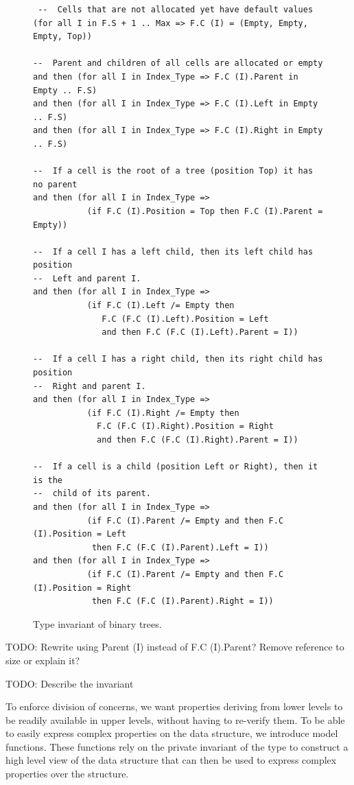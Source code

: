 \documentclass[11pt,a4paper]{article}
\begin{document}
\begin{figure}[ht]
\begin{small}
\begin{lstlisting}
 --  Cells that are not allocated yet have default values
(for all I in F.S + 1 .. Max => F.C (I) = (Empty, Empty, Empty, Top))

--  Parent and children of all cells are allocated or empty
and then (for all I in Index_Type => F.C (I).Parent in Empty .. F.S)
and then (for all I in Index_Type => F.C (I).Left in Empty .. F.S)
and then (for all I in Index_Type => F.C (I).Right in Empty .. F.S)

--  If a cell is the root of a tree (position Top) it has no parent
and then (for all I in Index_Type =>
           (if F.C (I).Position = Top then F.C (I).Parent = Empty))

--  If a cell I has a left child, then its left child has position
--  Left and parent I.
and then (for all I in Index_Type =>
           (if F.C (I).Left /= Empty then
              F.C (F.C (I).Left).Position = Left
              and then F.C (F.C (I).Left).Parent = I))

--  If a cell I has a right child, then its right child has position
--  Right and parent I.
and then (for all I in Index_Type =>
           (if F.C (I).Right /= Empty then
             F.C (F.C (I).Right).Position = Right
             and then F.C (F.C (I).Right).Parent = I))

--  If a cell is a child (position Left or Right), then it is the
--  child of its parent.
and then (for all I in Index_Type =>
           (if F.C (I).Parent /= Empty and then F.C (I).Position = Left
            then F.C (F.C (I).Parent).Left = I))
and then (for all I in Index_Type =>
           (if F.C (I).Parent /= Empty and then F.C (I).Position = Right
            then F.C (F.C (I).Parent).Right = I))
\end{lstlisting}
\end{small}
\caption{\label{fig-binary-inv} Type invariant of binary trees.}
\end{figure}

{\color{red} TODO: Rewrite using Parent (I) instead of F.C (I).Parent?
Remove reference to size or explain it?}

{\color{red} TODO: Describe the invariant}

To enforce division of concerns, we want properties deriving from lower levels to
be readily available in upper levels, without having to re-verify them. To be
able to easily express complex properties on the data structure, we
introduce model functions. These functions rely on the private invariant of the type
to construct a high level view of the data structure that can then be used to express
complex properties over the structure.
\end{document}
